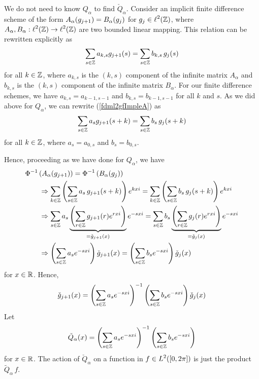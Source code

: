 We do not need to know $Q_\alpha$ to find $\check{Q}_\alpha$.
Consider an implicit finite difference scheme of the form
$\displaystyle A_\alpha(g_{j+1}) = B_\alpha(g_j)$ for
$\displaystyle g_j \in \ell^2(\mathbb{Z})$,
where $\displaystyle A_\alpha , B_\alpha:\ell^2(\mathbb{Z}) \to \ell^2(\mathbb{Z})$
are two bounded linear mapping.  This relation can be rewritten explicitly as
\begin{equation} \label{fdml2gfImpleA}
\sum_{s\in \mathbb{Z}} a_{k,s} g_{j+1}(s) = \sum_{s\in \mathbb{Z}} b_{k,s}\, g_j(s)
\end{equation}
for all $k \in \mathbb{Z}$, where $a_{k,s}$ is the $(k,s)$ component of the
infinite matrix $A_\alpha$ and $b_{k,s}$ is the $(k,s)$ component of the
infinite matrix $B_\alpha$.  For our finite difference schemes, we have
$a_{k,s} = a_{k-1,s-1}$ and $b_{k,s} = b_{k-1,s-1}$ for all $k$ and $s$.
As we did above for $Q_\alpha$, we can rewrite (\ref{fdml2gfImpleA}) as
\begin{equation} \label{fdml2gfImpl}
\sum_{s\in \mathbb{Z}} a_s g_{j+1}(s+k) = \sum_{s\in \mathbb{Z}} b_s\, g_j(s+k)
\end{equation}
for all $k\in \mathbb{Z}$, where $a_s = a_{0,s}$ and $b_s = b_{0,s}$.

Hence, proceeding as we have done for $Q_\alpha$, we have
\begin{align*}
&\Phi^{-1}\left(A_\alpha(g_{j+1})\right) = \Phi^{-1}\left(B_\alpha(g_j)\right) \\
&\qquad  \Rightarrow
\sum_{k\in \mathbb{Z}} \left(\sum_{s\in \mathbb{Z}} a_s\, g_{j+1}(s+k) \right) e^{kx i}
= \sum_{k\in \mathbb{Z}} \left(\sum_{s\in \mathbb{Z}} b_s\, g_j(s+k) \right) e^{kx i} \\
&\qquad \Rightarrow
\sum_{s\in \mathbb{Z}} a_s
\underbrace{\left( \sum_{r\in \mathbb{Z}}  g_{j+1}(r)
e^{rx i}\right)}_{=\check{g}_{j+1}(x)}  e^{-sx i}
= \sum_{s\in \mathbb{Z}} b_s
\underbrace{\left( \sum_{r\in \mathbb{Z}}  g_j(r)
e^{rx i}\right)}_{=\check{g}_j(x)}  e^{-sx i} \\
&\qquad \Rightarrow
\left( \sum_{s\in \mathbb{Z}} a_s e^{-sx i} \right) \check{g}_{j+1}(x)
= \left( \sum_{s\in \mathbb{Z}} b_s e^{-sx i} \right) \check{g}_j(x)
\end{align*}
for $x\in \mathbb{R}$.  Hence,
\[
\check{g}_{j+1}(x)
= \left( \sum_{s\in \mathbb{Z}} a_s e^{-sx i} \right)^{-1}
\left( \sum_{s\in \mathbb{Z}} b_s e^{-sx i} \right) \check{g}_j(x)
\]
Let
\[
\tilde{Q}_\alpha(x) = \left( \sum_{s\in \mathbb{Z}} a_s e^{-sx i} \right)^{-1}
\left( \sum_{s\in \mathbb{Z}} b_s e^{-sx i} \right)
\]
for $x \in \mathbb{R}$.  The action of $\check{Q}_\alpha$ on a function in
$\displaystyle f \in L^2([0,2\pi])$ is just the product $\tilde{Q}_\alpha\,f$.

